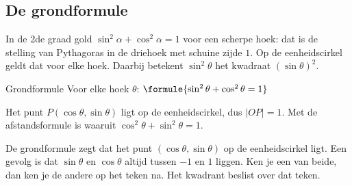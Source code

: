 \begin{oefeningen}
\end{oefeningen}

\subsection{De grondformule}

In de 2de graad gold $\sin^2\alpha + \cos^2\alpha = 1$ voor een scherpe hoek: dat is de stelling van Pythagoras in de driehoek met schuine zijde $1$. Op de eenheidscirkel geldt dat voor elke hoek. Daarbij betekent $\sin^2\theta$ het kwadraat $(\sin\theta)^2$.

\begin{theorie}
\begin{stelling}{Grondformule}
Voor elke hoek $\theta$: \quad $\formule{\sin^2\theta + \cos^2\theta = 1}$
\end{stelling}
\begin{bewijs}
Het punt $P(\cos\theta, \sin\theta)$ ligt op de eenheidscirkel, dus $|OP| = 1$. Met de afstandsformule is
waaruit $\cos^2\theta + \sin^2\theta = 1$.
\end{bewijs}
\end{theorie}

De grondformule zegt dat het punt $(\cos\theta, \sin\theta)$ op de eenheidscirkel ligt. Een gevolg is dat $\sin\theta$ en $\cos\theta$ altijd tussen $-1$ en $1$ liggen. Ken je een van beide, dan ken je de andere op het teken na. Het kwadrant beslist over dat teken.



